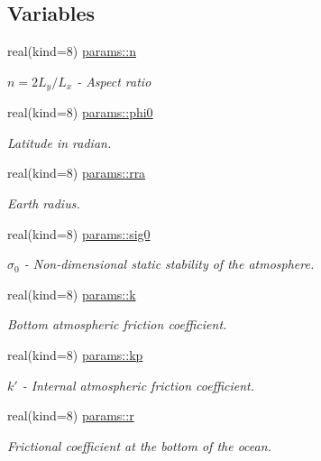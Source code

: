 \subsection*{Variables}
\begin{DoxyCompactItemize}
\item 
real(kind=8) \hyperlink{namespaceparams_abe66e904e07861ba1ef258ee92184e88}{params\+::n}
\begin{DoxyCompactList}\small\item\em $n = 2 L_y / L_x$ -\/ Aspect ratio \end{DoxyCompactList}\item 
real(kind=8) \hyperlink{namespaceparams_a7e58166ca3fb2153f781aa623c5c31e6}{params\+::phi0}
\begin{DoxyCompactList}\small\item\em Latitude in radian. \end{DoxyCompactList}\item 
real(kind=8) \hyperlink{namespaceparams_a192b2aa859cdeb4a0e285bcd0af346f4}{params\+::rra}
\begin{DoxyCompactList}\small\item\em Earth radius. \end{DoxyCompactList}\item 
real(kind=8) \hyperlink{namespaceparams_a9115211e1d9169ad56a3fa924c5f7ef3}{params\+::sig0}
\begin{DoxyCompactList}\small\item\em $\sigma_0$ -\/ Non-\/dimensional static stability of the atmosphere. \end{DoxyCompactList}\item 
real(kind=8) \hyperlink{namespaceparams_a6f40b299d2e21a177bf86afe5b06f790}{params\+::k}
\begin{DoxyCompactList}\small\item\em Bottom atmospheric friction coefficient. \end{DoxyCompactList}\item 
real(kind=8) \hyperlink{namespaceparams_a7474ac35238cf6acd2b02e7e6261b41d}{params\+::kp}
\begin{DoxyCompactList}\small\item\em $k'$ -\/ Internal atmospheric friction coefficient. \end{DoxyCompactList}\item 
real(kind=8) \hyperlink{namespaceparams_a714367f370ac26b8a281ebd6736407b7}{params\+::r}
\begin{DoxyCompactList}\small\item\em Frictional coefficient at the bottom of the ocean. \end{DoxyCompactList}\item 

\end{DoxyCompactItemize}
